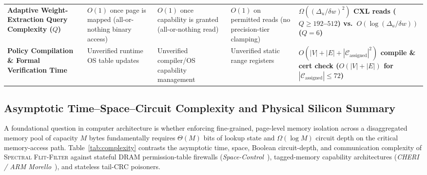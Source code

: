 \documentclass[10pt,twocolumn]{article}
\theoremstyle{spectralthm}
\begin{document}
\begin{table}[!tp]
\begin{tabularx}{\textwidth}{@{}>{\raggedright\hyphenpenalty=10000\arraybackslash}p{3.55cm} >{\raggedright\arraybackslash}X >{\raggedright\arraybackslash}X >{\raggedright\arraybackslash}X >{\raggedright\arraybackslash}X@{}}
\textbf{Adaptive Weight-Extraction Query Complexity ($Q$)} & $O(1)$ once page is mapped (all-or-nothing binary access) & $O(1)$ once capability is granted (all-or-nothing read) & $O(1)$ on permitted reads (no precision-tier clamping) & \textbf{$\Omega((\Delta_u/\delta w)^2)$ CXL reads ($Q \ge 192$--$512$) vs.\ $O(\log(\Delta_u/\delta w))$ ($Q=6$)} \\
\textbf{Policy Compilation \& Formal Verification Time} & Unverified runtime OS table updates & Unverified compiler/OS capability management & Unverified static range registers & \textbf{$O(|V| + |E| + |\mathcal{C}_{\mathrm{assigned}}|^2)$ compile \& cert check ($O(|V| + |E|)$ for $|\mathcal{C}_{\mathrm{assigned}}| \le 72$)} \\
\bottomrule
\end{tabularx}
\end{table}

\subsection{Asymptotic Time--Space--Circuit Complexity and Physical Silicon Summary}
\label{sec:complexity_silicon}
A foundational question in computer architecture is whether enforcing fine-grained, page-level memory isolation across a disaggregated memory pool of capacity $M$ bytes fundamentally requires $\Theta(M)$ bits of lookup state and $\Omega(\log M)$ circuit depth on the critical memory-access path. Table~\ref{tab:complexity} contrasts the asymptotic time, space, Boolean circuit-depth, and communication complexity of \textsc{Spectral Flit-Filter} against stateful DRAM permission-table firewalls (\textit{Space-Control}~\cite{goswami2026spacecontrol}), tagged-memory capability architectures (\textit{CHERI / ARM Morello}~\cite{watson2015cheri}), and stateless tail-CRC poisoners.
\end{document}
